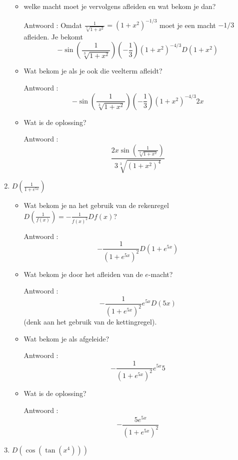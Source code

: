 \begin{enumerate}
\begin{itemize}
		\item welke macht moet je vervolgens afleiden en wat bekom je dan?
		
		Antwoord : Omdat $\frac{1}{\sqrt[3]{1+x^2}}=\left( 1+x^2  \right)^{-1/3}$ moet je een macht $-1/3$ afleiden. Je bekomt
		\[
		-\sin \left(  \frac{1}{\sqrt[3]{1+x^2}} \right) \left( -\frac{1}{3}  \right) \left( 1+x^2  \right)^{-4/3}D\left( 1+x^2  \right)
		\]
		
		\item Wat bekom je als je ook die veelterm afleidt?
		
		Antwoord : \[-\sin \left(  \frac{1}{\sqrt[3]{1+x^2}} \right) \left( -\frac{1}{3}  \right) \left( 1+x^2  \right)^{-4/3}2x\]
		
		\item Wat is de oplossing?
		
		Antwoord : \[\frac {2x\sin \left( \frac {1}{\sqrt[3]{1+x^2}} \right)}{3 \sqrt[3]{\left( 1+x^2  \right) ^4}}\]
		
	\end{itemize}
	
	\item $D \left( \frac {1}{1+e^{5x}} \right)$
	
	\begin{itemize}
		
		\item Wat bekom je na het gebruik van de rekenregel $D \left( \frac{1}{f(x)} \right)=-\frac {1}{f(x)^2}Df(x)$?
		
		Antwoord : \[-\frac{1}{\left( 1+e^{5x}  \right)^2}D \left ( 1+e^{5x} \right)\]
		
		\item Wat bekom je door het afleiden van de $e$-macht?
		
		Antwoord : \[-\frac{1}{\left( 1+e^{5x}  \right)^2}e^{5x}D(5x)\] (denk aan het gebruik van de kettingregel).
		
		\item Wat bekom je als afgeleide?
		
		Antwoord : \[-\frac{1}{\left( 1+e^{5x}  \right)^2}e^{5x}5\]
		
		\item Wat is de oplossing?
		
		Antwoord : \[-\frac {5e^{5x}}{\left( 1+e^{5x}  \right)^2}\]
		
	\end{itemize}
	
	\item $D \left( \cos \left( \tan \left(  x^4 \right)  \right)  \right)$
	

\end{enumerate}
